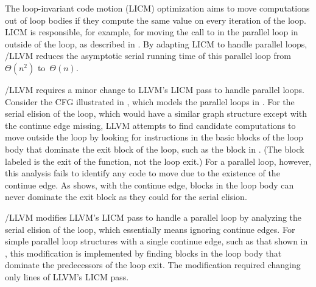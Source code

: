 The loop-invariant code motion (LICM) optimization
\cite[Sec.~13.2]{Muchnick97} aims to move computations out of loop
bodies if they compute the same value on every iteration of the loop.
LICM is responsible, for example, for moving the call to 
in the parallel loop in  outside of the loop,
as described in .  By adapting LICM to handle parallel
loops, \tapir/LLVM reduces the asymptotic serial running time of this
parallel loop from $\Theta(n^2)$
to~$\Theta(n)$.



\tapir/LLVM requires a minor change to LLVM's LICM pass to handle
parallel loops.  Consider the CFG illustrated in
, which models the parallel loops in
.  For the serial elision of the loop, which would
have a similar graph structure except with the continue edge missing,
LLVM attempts to find candidate computations to move outside the loop
by looking for instructions in the basic blocks of the loop body that
dominate the exit block of the loop, such as the block  in
.  (The block labeled  is the exit
of the function, not the loop exit.)  For a parallel loop, however,
this analysis fails to identify any code to move due to the existence
of the continue edge.  As  shows, with the
continue edge, blocks in the loop body can never dominate the exit
block  as they could for the serial elision.

\tapir/LLVM modifies LLVM's LICM pass to handle a parallel loop by
analyzing the serial elision of the loop, which essentially means
ignoring continue edges.  For simple parallel loop structures with a
single continue edge, such as that shown in ,
this modification is implemented by finding blocks in the loop body
that dominate the predecessors of the loop exit.  The modification
required changing only  lines of LLVM's LICM
pass.

